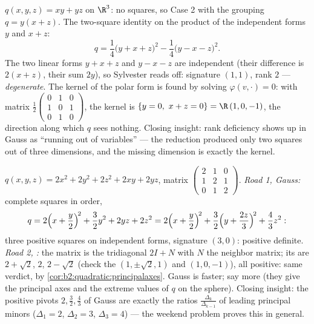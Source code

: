 \begin{example}\label{ex:b2:quadratic:degenerate}
$q(x, y, z) = xy + yz$ on $\R^3$: no squares, so Case 2 with the
grouping $q = y(x + z)$. The two-square identity on the product
of the independent forms $y$ and $x + z$:
\[
q = \frac14\bigl(y + x + z\bigr)^2 -
\frac14\bigl(y - x - z\bigr)^2 .
\]
The two linear forms $y + x + z$ and $y - x - z$ are
independent (their difference is $2(x+z)$, their sum $2y$), so
Sylvester reads off: signature $(1, 1)$, rank $2$ ---
\emph{degenerate}. The kernel of the polar form is found by
solving $\varphi(v, \cdot) = 0$: with matrix
$\frac12\begin{pmatrix} 0&1&0\\ 1&0&1\\ 0&1&0\end{pmatrix}$,
the kernel is $\{y = 0,\ x + z = 0\} = \R\,(1, 0, -1)$, the
direction along which $q$ sees nothing. Closing insight: rank
deficiency shows up in Gauss as ``running out of variables''
--- the reduction produced only two squares out of three
dimensions, and the missing dimension is exactly the kernel.
\end{example}

\begin{example}\label{ex:b2:quadratic:tworoads}
$q(x, y, z) = 2x^2 + 2y^2 + 2z^2 + 2xy + 2yz$, matrix
$\begin{pmatrix} 2 & 1 & 0\\ 1 & 2 & 1\\ 0 & 1 & 2
\end{pmatrix}$. \emph{Road 1, Gauss:} complete squares in
order,
\[
q = 2\Bigl(x + \frac y2\Bigr)^{\!2} + \frac32 y^2 + 2yz + 2z^2
= 2\Bigl(x + \frac y2\Bigr)^{\!2}
+ \frac32\Bigl(y + \frac{2z}{3}\Bigr)^{\!2} + \frac43 z^2 :
\]
three positive squares on independent forms, signature $(3,
0)$: positive definite. \emph{Road 2, :} the matrix
is the tridiagonal $2I + N$ with $N$ the neighbor matrix; its
 are $2 + \sqrt2$, $2$, $2 - \sqrt2$ (check the
 $(1, \pm\sqrt2, 1)$ and $(1, 0, -1)$), all
positive: same verdict, by
\cref{cor:b2:quadratic:principalaxes}. Gauss is faster;
 say more (they give the principal axes and the
extreme values of $q$ on the sphere). Closing insight: the
positive pivots $2, \frac32, \frac43$ of Gauss are exactly the
ratios $\frac{\Delta_k}{\Delta_{k-1}}$ of leading principal
minors ($\Delta_1 = 2$, $\Delta_2 = 3$, $\Delta_3 = 4$) --- the
weekend problem proves this in general.
\end{example}

